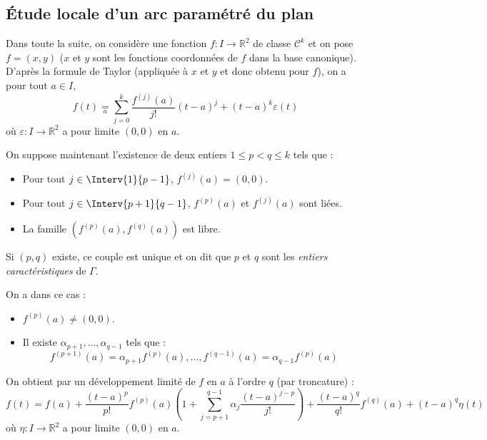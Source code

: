 \documentclass[a4paper,10pt]{report}
\begin{document}

\subsection{Étude locale d'un arc paramétré du plan}
Dans toute la suite, on considère une fonction $f : I \rightarrow \mathbb{R}^2$ de classe $\mathcal{C}^k$ et on pose $f=(x,y)$ ($x$ et $y$ sont les fonctions coordonnées de $f$ dans la base canonique). D'après la formule de Taylor (appliquée à $x$ et $y$ et donc obtenu pour $f$), on a pour tout $a \in I$,
$$ f(t)  \underset{a}{=} \sum_{j=0}^k \dfrac{f^{(j)}(a)}{j!} (t-a)^j+ (t-a)^k \varepsilon(t)$$
où $\varepsilon : I \rightarrow \mathbb{R}^2$ a pour limite $(0,0)$ en $a$.

\medskip

On suppose maintenant l'existence de deux entiers $1 \leq p <q \leq k$ tels que :
\begin{itemize}
\item Pour tout $j \in \Interv{1}{p-1}$, $f^{(j)}(a)=(0,0)$.
\item Pour tout $j \in \Interv{p+1}{q-1}$, $f^{(p)}(a)$ et $f^{(j)}(a)$ sont liées.
\item La famille $(f^{(p)}(a), f^{(q)}(a))$ est libre.
\end{itemize}

\medskip

Si $(p,q)$ existe, ce couple est unique et on dit que $p$ et $q$ sont les \emph{entiers caractéristiques} de $\Gamma$. 

\medskip

On a dans ce cas :

\begin{itemize}
\item $f^{(p)}(a) \neq (0,0)$.
\item Il existe $\alpha_{p+1}, \ldots, \alpha_{q-1}$ tels que :
$$ f^{(p+1)}(a) = \alpha_{p+1} f^{(p)}(a), \ldots,  f^{(q-1)}(a)= \alpha_{q-1} f^{(p)}(a)$$
\end{itemize}
On obtient par un développement limité de $f$ en $a$ à l'ordre $q$ (par troncature) : 
$$ f(t) =  f(a) + \dfrac{(t-a)^p}{p!} f^{(p)}(a) \left( 1 + \sum_{j=p+1}^{q-1} \alpha_j \dfrac{(t-a)^{j-p}}{j!} \right) + \dfrac{(t-a)^q}{q!} f^{(q)}(a) + (t-a)^q \eta(t)$$
où $\eta : I \rightarrow \mathbb{R}^2$ a pour limite $(0,0)$ en $a$.
\end{document}
